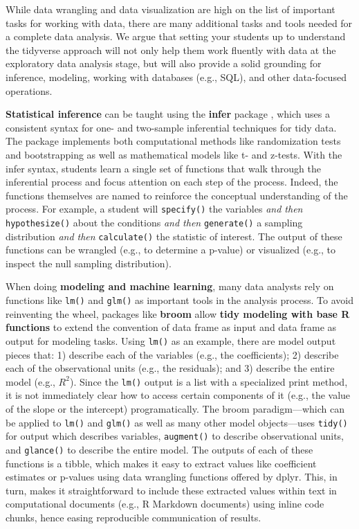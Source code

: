 \documentclass[12pt]{article}
\begin{document}
While data wrangling and data visualization are high on the list of
important tasks for working with data, there are many additional tasks
and tools needed for a complete data analysis. We argue that setting
your students up to understand the tidyverse approach will not only help
them work fluently with data at the exploratory data analysis stage, but
will also provide a solid grounding for inference, modeling, working
with databases (e.g., SQL), and other data-focused operations.

\textbf{Statistical inference} can be taught using the \textbf{infer}
package \citep{R-infer}, which uses a consistent syntax for one- and
two-sample inferential techniques for tidy data. The package implements
both computational methods like randomization tests and bootstrapping as
well as mathematical models like t- and z-tests. With the infer syntax,
students learn a single set of functions that walk through the
inferential process and focus attention on each step of the process.
Indeed, the functions themselves are named to reinforce the conceptual
understanding of the process. For example, a student will
\texttt{specify()} the variables \emph{and then} \texttt{hypothesize()}
about the conditions \emph{and then} \texttt{generate()} a sampling
distribution \emph{and then} \texttt{calculate()} the statistic of
interest. The output of these functions can be wrangled (e.g., to
determine a p-value) or visualized (e.g., to inspect the null sampling
distribution).

When doing \textbf{modeling and machine learning}, many data analysts
rely on functions like \texttt{lm()} and \texttt{glm()} as important
tools in the analysis process. To avoid reinventing the wheel, packages
like \textbf{broom} \citep{R-broom} allow \textbf{tidy modeling with
base R functions} to extend the convention of data frame as input and
data frame as output for modeling tasks. Using \texttt{lm()} as an
example, there are model output pieces that: 1) describe each of the
variables (e.g., the coefficients); 2) describe each of the
observational units (e.g., the residuals); and 3) describe the entire
model (e.g., \(R^2\)). Since the \texttt{lm()} output is a list with a
specialized print method, it is not immediately clear how to access
certain components of it (e.g., the value of the slope or the intercept)
programatically. The broom paradigm---which can be applied to
\texttt{lm()} and \texttt{glm()} as well as many other model
objects---uses \texttt{tidy()} for output which describes variables,
\texttt{augment()} to describe observational units, and
\texttt{glance()} to describe the entire model. The outputs of each of
these functions is a tibble, which makes it easy to extract values like
coefficient estimates or p-values using data wrangling functions offered
by dplyr. This, in turn, makes it straightforward to include these
extracted values within text in computational documents (e.g., R
Markdown documents) using inline code chunks, hence easing reproducible
communication of results.
\end{document}
